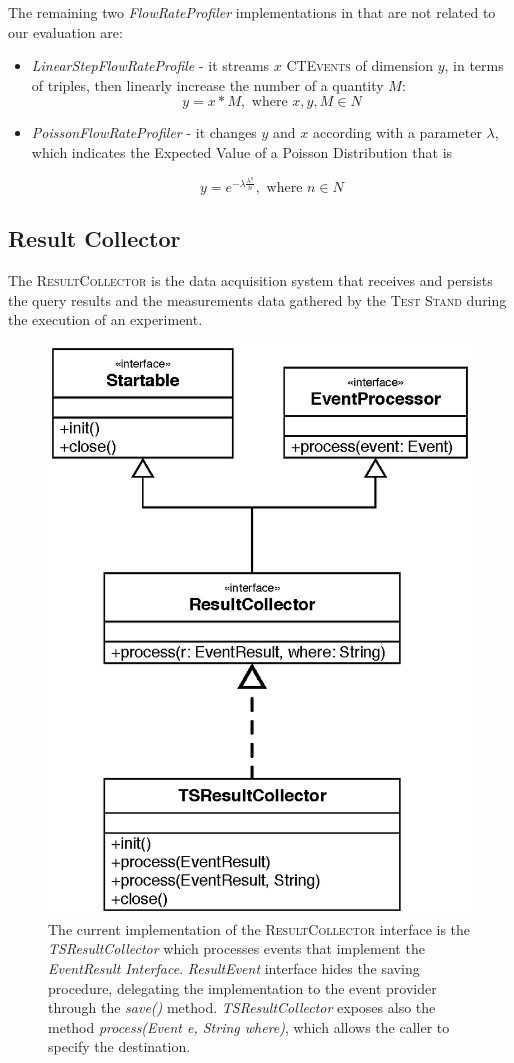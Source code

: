 The remaining two  \textit{FlowRateProfiler} implementations in \name that are not related to our evaluation are:
\begin{itemize}
\item \textit{LinearStepFlowRateProfile} - it streams $x$ \textsc{CTEvents} of dimension $y$, in terms of triples, then linearly increase the number of a quantity $M$: \[y=x*M, \text{ where } x,y,M \in N\]
\item \textit{PoissonFlowRateProfiler} - it changes $y$ and $x$ according with a parameter $\lambda$, which indicates the Expected Value of a Poisson Distribution that is

\[y=e^{- \lambda \frac{\lambda^n}{n}}, \text{ where } n \in N  \]
\end{itemize}


\subsection{Result Collector}\label{sec:result-collector-impl}

\noindent The \textsc{ResultCollector} is the data acquisition system that receives and persists the query results and the measurements data gathered by the \textsc{Test Stand} during the execution of an experiment.

\begin{figure}[tbh]
  \centering
	\includegraphics[width=0.5\linewidth]{images/uml_resultcollector}
	\caption[\textsc{ResultCollector} Current Implementation - UML Schema]{The current implementation of the \textsc{ResultCollector} interface is the \textit{TSResultCollector} which processes events that implement the \textit{EventResult Interface}. \textit{ResultEvent} interface hides the saving procedure, delegating the implementation to the event provider through    the \textit{save()} method. \textit{TSResultCollector} exposes also the method \textit{process(Event e, String where)}, which allows the caller to specify the destination. } 
  	\label{fig:uml_resultcollector}
\end{figure}

